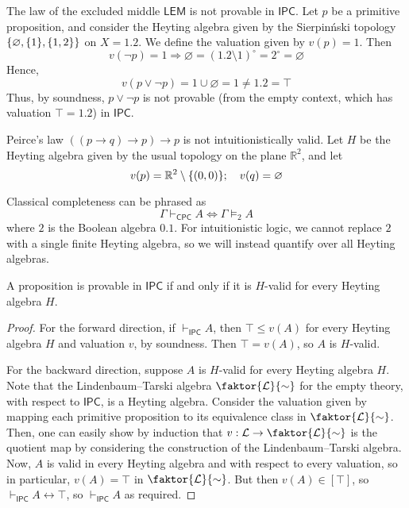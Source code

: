 \begin{example}
    The law of the excluded middle \( \mathsf{LEM} \) is not provable in \( \mathsf{IPC} \).
    Let \( p \) be a primitive proposition, and consider the Heyting algebra given by the Sierpin\'nski topology \( \qty{\varnothing, \qty{1}, \qty{1, 2}} \) on \( X = \qty{1,2} \).
    We define the valuation given by \( v(p) = \qty{1} \).
    Then
    \[ v(\neg p) = \qty{1} \Rightarrow \varnothing = (\qty{1, 2} \setminus \qty{1})^\circ = \qty{2}^\circ = \varnothing \]
    Hence,
    \[ v(p \vee \neg p) = \qty{1} \cup \varnothing = \qty{1} \neq \qty{1, 2} = \top \]
    Thus, by soundness, \( p \vee \neg p \) is not provable (from the empty context, which has valuation \( \top = \qty{1, 2} \)) in \( \mathsf{IPC} \).
\end{example}
\begin{example}
    Peirce's law \( ((p \to q) \to p) \to p \) is not intuitionistically valid.
    Let \( H \) be the Heyting algebra given by the usual topology on the plane \( \mathbb R^2 \), and let
    \[ v(p) = \mathbb R^2 \setminus \qty{(0, 0)};\quad v(q) = \varnothing \]
\end{example}
Classical completeness can be phrased as
\[ \Gamma \vdash_{\mathsf{CPC}} A \iff \Gamma \vDash_2 A \]
where \( 2 \) is the Boolean algebra \( \qty{0, 1} \).
For intuitionistic logic, we cannot replace \( 2 \) with a single finite Heyting algebra, so we will instead quantify over all Heyting algebras.
\begin{theorem}[completeness]
    A proposition is provable in \( \mathsf{IPC} \) if and only if it is \( H \)-valid for every Heyting algebra \( H \).
\end{theorem}
\begin{proof}
    For the forward direction, if \( \vdash_{\mathsf{IPC}} A \), then \( \top \leq v(A) \) for every Heyting algebra \( H \) and valuation \( v \), by soundness.
    Then \( \top = v(A) \), so \( A \) is \( H \)-valid.

    For the backward direction, suppose \( A \) is \( H \)-valid for every Heyting algebra \( H \).
    Note that the Lindenbaum--Tarski algebra \( \faktor{\mathcal L}{\sim} \) for the empty theory, with respect to \( \mathsf{IPC} \), is a Heyting algebra.
    Consider the valuation given by mapping each primitive proposition to its equivalence class in \( \faktor{\mathcal L}{\sim} \).
    Then, one can easily show by induction that \( v : \mathcal L \to \faktor{\mathcal L}{\sim} \) is the quotient map by considering the construction of the Lindenbaum--Tarski algebra.
    Now, \( A \) is valid in every Heyting algebra and with respect to every valuation, so in particular, \( v(A) = \top \) in \( \faktor{\mathcal L}{\sim} \).
    But then \( v(A) \in [\top] \), so \( \vdash_{\mathsf{IPC}} A \leftrightarrow \top \), so \( \vdash_{\mathsf{IPC}} A \) as required.
\end{proof}

